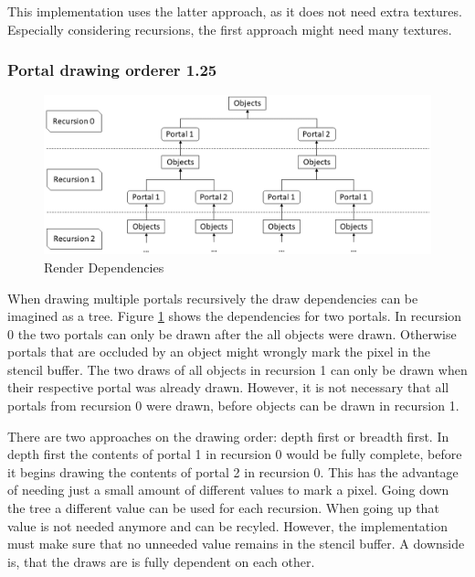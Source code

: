 
This implementation uses the latter approach, as it does not need extra textures. Especially considering recursions, the first approach might need many textures. 

\subsubsection{Portal drawing orderer 1.25}

\begin{figure}[h]
	\includegraphics[width=\linewidth]{images/rendertree.png}
	\caption{Render Dependencies}
	\label{fig:rendertree}
\end{figure}


When drawing multiple portals recursively the draw dependencies can be imagined as a tree. Figure \ref{fig:rendertree} shows the dependencies for two portals. In recursion 0 the two portals can only be drawn after the all objects were drawn. Otherwise portals that are occluded by an object might wrongly mark the pixel in the stencil buffer. The two draws of all objects in recursion 1 can only be drawn when their respective portal was already drawn. However, it is not necessary that all portals from recursion 0 were drawn, before objects can be drawn in recursion 1.

There are two approaches on the drawing order: depth first or breadth first. In depth first the contents of portal 1 in recursion 0 would be fully complete, before it begins drawing the contents of portal 2 in recursion 0. This has the advantage of needing just a small amount of different values to mark a pixel. Going down the tree a different value can be used for each recursion. When going up that value is not needed anymore and can be recyled. However, the implementation must make sure that no unneeded value remains in the stencil buffer. A downside is, that the draws are is fully dependent on each other.

